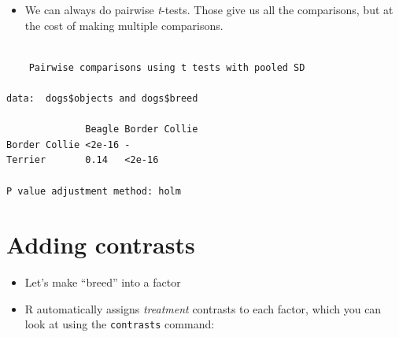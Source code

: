 \documentclass[]{article}
\newenvironment{Shaded}{}{}
\newcommand{\KeywordTok}[1]{\textcolor[rgb]{0.00,0.44,0.13}{\textbf{{#1}}}}
\newcommand{\DataTypeTok}[1]{\textcolor[rgb]{0.56,0.13,0.00}{{#1}}}
\newcommand{\StringTok}[1]{\textcolor[rgb]{0.25,0.44,0.63}{{#1}}}
\newcommand{\NormalTok}[1]{{#1}}
\begin{document}
\begin{itemize}
\itemsep1pt\parskip0pt
\item
  We can always do pairwise \emph{t}-tests. Those give us all the
  comparisons, but at the cost of making multiple comparisons.
\end{itemize}

\begin{Shaded}
\end{Shaded}

\begin{verbatim}

    Pairwise comparisons using t tests with pooled SD 

data:  dogs$objects and dogs$breed 

              Beagle Border Collie
Border Collie <2e-16 -            
Terrier       0.14   <2e-16       

P value adjustment method: holm 
\end{verbatim}

\section{Adding contrasts}\label{adding-contrasts}

\begin{itemize}
\itemsep1pt\parskip0pt
\item
  Let's make ``breed'' into a factor
\end{itemize}

\begin{Shaded}
\end{Shaded}

\begin{itemize}
\itemsep1pt\parskip0pt
\item
  R automatically assigns \emph{treatment} contrasts to each factor,
  which you can look at using the \texttt{contrasts} command:
\end{itemize}

\begin{Shaded}
\end{Shaded}
\end{document}
